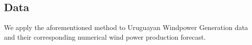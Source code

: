 \documentclass[10pt,twocolumn,letterpaper]{article}
\begin{document}
%
%
%
%
%
%




\subsection{Data}
We apply the aforementioned method to Uruguayan Windpower Generation data and their corresponding numerical wind power production forecast. 
\end{document}

